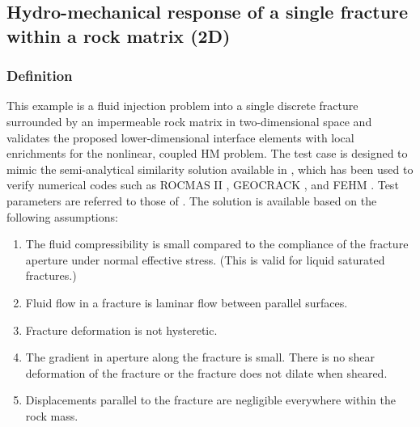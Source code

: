 \subsection{Hydro-mechanical response of a single fracture within a rock matrix (2D)}

\subsubsection*{Definition}
This example is a fluid injection problem into a single discrete fracture surrounded by an impermeable rock matrix in two-dimensional space and validates the proposed lower-dimensional interface elements with local enrichments for the nonlinear, coupled HM problem. 
The test case is designed to mimic the semi-analytical similarity solution available in \cite{Wijesinghe1986}, which has been used to verify numerical codes such as ROCMAS II \cite{Noorishad1992}, GEOCRACK \cite{Swenson1995}, and FEHM \cite{Bower1997}. Test parameters are referred to those of  \cite{Bower1997}.
The solution is available based on the following assumptions:
\begin{enumerate}
\item  The fluid compressibility is small compared to the compliance of the fracture aperture under normal effective stress. (This is valid for liquid saturated fractures.)
\item  Fluid flow in a fracture is laminar flow between parallel surfaces.
\item  Fracture deformation is not hysteretic.
\item  The gradient in aperture along the fracture is small. There is no shear deformation of the fracture or the fracture does not dilate when sheared.
\item  Displacements parallel to the fracture are negligible everywhere within the rock mass.
\end{enumerate}

